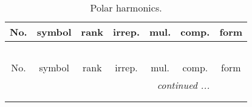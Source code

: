 \documentclass[fleqn,10pt,landscape]{article}
\begin{document}
\begin{itemize}
\begin{center}
\renewcommand{\arraystretch}{1.3}
\begin{longtable}{ccccccc}
\caption{Polar harmonics.}
 \\
 \hline \hline
No. & symbol & rank & irrep. & mul. & comp. & form \\ \hline \endfirsthead

\multicolumn{6}{l}{\tablename\ \thetable{}} \\
 \hline \hline
No. & symbol & rank & irrep. & mul. & comp. & form \\ \hline \endhead

 \hline \hline
\multicolumn{6}{r}{\footnotesize\it continued ...} \\ \endfoot

 \hline \hline
\multicolumn{6}{r}{} \\ \endlastfoot


\end{longtable}
\end{center}
\end{itemize}
\end{document}

